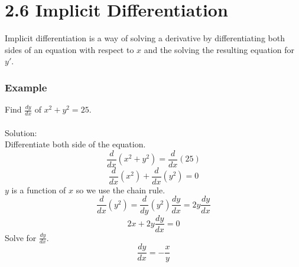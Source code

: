 %
%

\section*{2.6 Implicit Differentiation}

Implicit differentiation is a way of solving a derivative by differentiating both sides of an equation with respect to \(x\) and the solving the resulting equation for \(y'\).

\subsubsection*{Example}

Find \(\frac{dy}{dx} \) of \( x^2+y^2=25 \).\\\\
Solution:\\
Differentiate both side of the equation.
$$ \frac{d}{dx}(x^2+y^2) = \frac{d}{dx}(25) $$
$$ \frac{d}{dx}(x^2)+\frac{d}{dx}(y^2)=0$$
\(y\) is a function of \(x\) so we use the chain rule.
$$ \frac{d}{dx}(y^2) = \frac{d}{dy} (y^2) \frac{dy}{dx} = 2y\frac{dy}{dx}$$
$$ 2x + 2y \frac{dy}{dx} = 0 $$
Solve for \(\frac{dy}{dx}\).
$$ \frac{dy}{dx}=-\frac{x}{y} $$
